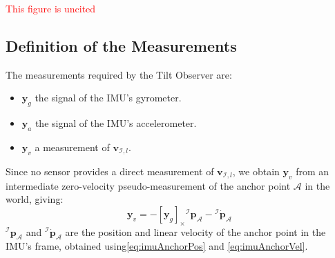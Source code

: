 \documentclass{IJCAS}
\begin{document}
\textcolor{red}{This figure is uncited}

\subsection{Definition of the Measurements}
The measurements required by the Tilt Observer are:
\begin{itemize}
    \item $\boldsymbol{y}_{g}$ the signal of the IMU's gyrometer.
    \item $\boldsymbol{y}_{a}$ the signal of the IMU's accelerometer.
    \item $\boldsymbol{y}_{v}$ a measurement of $\boldsymbol{v}_{\mathcal{I}, l}$.
\end{itemize}
Since no sensor provides a direct measurement of $\boldsymbol{v}_{\mathcal{I}, l}$, we obtain $\boldsymbol{y}_{v}$ from an intermediate zero-velocity pseudo-measurement of the anchor point $\mathcal{A}$ in the world, giving:
\begin{equation}
    \boldsymbol{y}_v = - \left[\boldsymbol{y}_{g}\right]_{\times} {^{\mathcal{I}}}\boldsymbol{p}_{\mathcal{A}} - {^{\mathcal{I}}} \dot{\boldsymbol{p}}_{\mathcal{A}} \label{eq:yv}
\end{equation}
${^{\mathcal{I}}}\boldsymbol{p}_{\mathcal{A}}$ and ${^{\mathcal{I}}} \dot{\boldsymbol{p}}_{\mathcal{A}}$ are the position and linear velocity of the anchor point in the IMU's frame, obtained using\eqref{eq:imuAnchorPos} and \eqref{eq:imuAnchorVel}.
\end{document}
